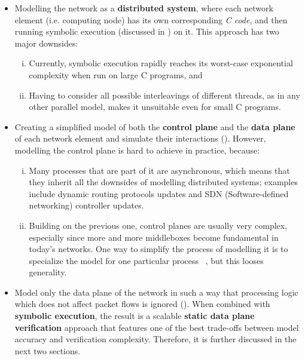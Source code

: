 \begin{itemize}
  \item Modelling the network as a \textbf{distributed system}, where each
    network element (i.e. computing node) has its own corresponding \emph{C
    code}, and then running symbolic execution (discussed in
    ) on it.  This approach has two
    major downsides:
      \begin{enumerate}[(i)]
        \item Currently, symbolic execution rapidly reaches its worst-case
          exponential complexity when run on large C programs, and
        \item Having to consider all possible interleavings of different
          threads, as in any other parallel model, makes it unsuitable even
          for small C programs.
      \end{enumerate}
  \item Creating a simplified model of both the \textbf{control plane} and the
    \textbf{data plane} of each network element and simulate their interactions
    ().  However, modelling the
    control plane is hard to achieve in practice, because:
    \begin{enumerate}[(i)]
      \item Many processes that are part of it are asynchronous, which means
        that they inherit all the downsides of modelling distributed systems;
        examples include dynamic routing protocols updates and SDN
        (Software-defined networking)
        controller updates.
      \item Building on the previous one, control planes are usually very
        complex, especially since more and more middleboxes become fundamental
        in today's networks.  One way to simplify the process of modelling it
        is to specialize the model for one particular process
       ~\cite{weitz2016bagpipe, fogel2015general}, but this looses generality.
    \end{enumerate}
  \item Model only the data plane of the network in such a way that processing
    logic which does not affect packet flows is ignored
    ().  When combined with
    \textbf{symbolic execution}, the result is a scalable
    \textbf{static data plane verification} approach that features one of the
    best trade-offs between model accuracy and verification complexity.
    Therefore, it is further discussed in the next two sections.
\end{itemize}

